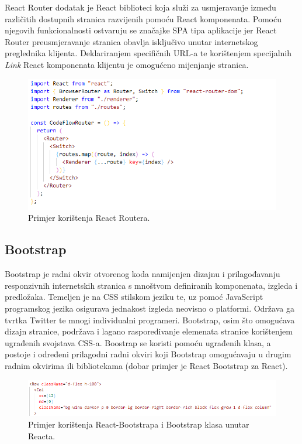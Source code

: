 \documentclass[times, utf8, zavrsni, numeric]{fer}
\begin{document}
			React Router\cite{react-router2021} dodatak je React biblioteci koja služi za usmjeravanje između različitih dostupnih  stranica razvijenih pomoću React komponenata. Pomoću njegovih funkcionalnosti ostvaruju se značajke SPA tipa aplikacije jer React Router preusmjeravanje stranica obavlja isključivo unutar internetskog preglednika klijenta. Deklariranjem specifičnih URL-a  te korištenjem specijalnih \textit{Link} React komponenata klijentu je omogućeno mijenjanje stranica.
			\begin{figure}[H]
				\centering
				\includegraphics[scale=0.75]{pictures/prikazi/ReactRouter.png}
				\caption{Primjer korištenja React Routera.}
				\label{fig:react-router}
			\end{figure}
			
			\subsection{Bootstrap}
			Bootstrap\cite{bootstrap2021} je radni okvir  otvorenog koda namijenjen dizajnu i prilagođavanju responzivnih internetskih stranica s mnoštvom definiranih komponenata, izgleda i predložaka. Temeljen je na CSS stilskom jeziku te, uz pomoć JavaScript programskog jezika osigurava jednakost izgleda neovisno o platformi. Održava ga tvrtka Twitter te mnogi individualni programeri. Bootstrap, osim što omogućava dizajn stranice, podržava i lagano raspoređivanje elemenata stranice korištenjem ugrađenih svojstava CSS-a. Boostrap se koristi pomoću ugrađenih klasa, a postoje i određeni prilagodni radni okviri koji Bootstrap omogućavaju u drugim radnim okvirima ili bibliotekama (dobar primjer je React Bootstrap za React).
			\begin{figure}[H]
				\centering
				\includegraphics[width=\linewidth]{pictures/prikazi/Bootstrap.png}
				\caption{Primjer korištenja React-Bootstrapa i Bootstrap klasa unutar Reacta.}
				\label{fig:bootstrap}
			\end{figure}
			
\end{document}

